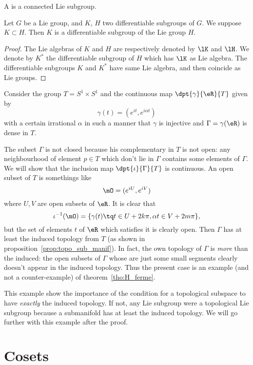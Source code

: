 \begin{definition}
A  is a connected Lie subgroup.
\end{definition}

\begin{corollary}
Let $G$ be a Lie group, and $K$, $H$ two differentiable subgroups of $G$. We suppose $K\subset H$. Then $K$ is a differentiable subgroup of the Lie group $H$.
\end{corollary}

\begin{proof}
The Lie algebras of $K$ and $H$ are respectively denoted by $\lK$ and $\lH$. We denote by $K^*$ the differentiable subgroup of $H$ which has $\lK$ as Lie algebra. The differentiable subgroups $K$ and $K^*$ have same Lie algebra, and then coincide as Lie groups.
\end{proof}

\label{pg:ex_topo_Lie}
Consider the group $T=S^1\times S^1$ and the continuous map $\dpt{\gamma}{\eR}{T}$ given by
\[
  \gamma(t)=(e^{it},e^{i\alpha t})
\]
with a certain irrational $\alpha$ in such a manner that $\gamma$ is injective and $\Gamma=\gamma(\eR)$ is dense in $T$.

The subset $\Gamma$ is not closed because his complementary in $T$ is not open: any neighbourhood of element $p\in T$ which don't lie in $\Gamma$ contains some elements of $\Gamma$. We will show that the inclusion map $\dpt{\iota}{\Gamma}{T}$ is continuous. An open subset of $T$ is somethings like
\[
  \mO=(e^{iU},e^{iV})
\]
where $U,V$ are open subsets of $\eR$. It is clear that
\[
   \iota^{-1}(\mO)=\{ \gamma(t)\tq t\in U+2k\pi,\alpha t\in V+2m\pi \},
\]
but the set of elements $t$ of $\eR$ which satisfies it is clearly open. Then $\Gamma$ has at least the induced topology from $T$ (as shown in proposition~\ref{prop:topo_sub_manif}). In fact, the own topology of $\Gamma$ is \emph{more} than the induced: the open subsets of $\Gamma$ whose are just some small segments clearly doesn't appear in the induced topology. Thus the present case is an example (and not a counter-example) of theorem~\ref{tho:H_ferme}.

This example show the importance of the condition for a topological subspace to have \emph{exactly} the induced topology. If not, any Lie subgroup were a topological Lie subgroup because a submanifold has at least the induced topology. We will go further with this example after the proof.

\section{Cosets}

